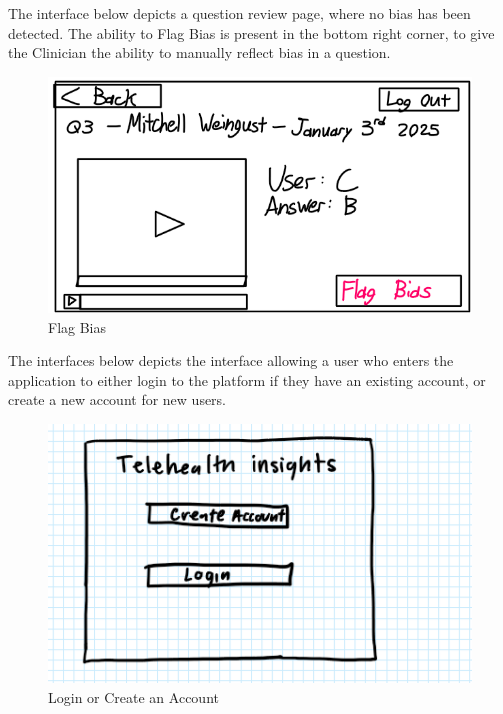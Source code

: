 \documentclass[12pt, titlepage]{article}
\begin{document}
\hspace{1.5em}The interface below depicts a question review page, where no bias has been detected. The ability to Flag Bias is present in the bottom right corner, to give the Clinician the ability to manually reflect bias in a question.
\begin{figure}[H]
  \centering
  \includegraphics[scale=0.9]{images/Flag-Bias.png}
  \caption{Flag Bias}
\end{figure}

\hspace{1.5em}The interfaces below depicts the interface allowing a user who enters the application to either login to the platform if they have an existing account, or create a new account for new users.
\begin{figure}[H]
  \centering
  \includegraphics[scale=0.9]{images/createORlogin.png}
  \caption{Login or Create an Account}
\end{figure}
\end{document}
